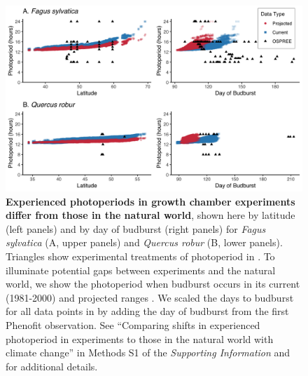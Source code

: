 \documentclass{article}
\begin{document}
\begin{figure}[h]
\includegraphics{2D_actual_combined.png} 
\caption{\textbf{Experienced photoperiods in growth chamber experiments differ from those in the natural world}, shown here by latitude (left panels) and by day of budburst (right panels) for \emph{Fagus sylvatica} (A, upper panels) and \emph{Quercus robur} (B, lower panels). Triangles show experimental treatments of photoperiod in \citet{wolkovich2019}. To illuminate potential gaps between experiments and the natural world, we show the photoperiod when budburst occurs in its current (1981-2000) and projected ranges \citep[2081-2100, using the A1Fi Phenofit scenario, see][]{duputie2015}. We scaled the days to budburst for all data points in \citet{wolkovich2019} by adding the day of budburst from the first Phenofit observation. See ``Comparing shifts in experienced photoperiod in experiments to those in the natural world with climate change'' in Methods S1 of the \emph{Supporting Information} and \citet{duputie2015} for additional details.} 
 \label{fig:fagus}
 \end{figure}
 
\clearpage 
\end{document}
